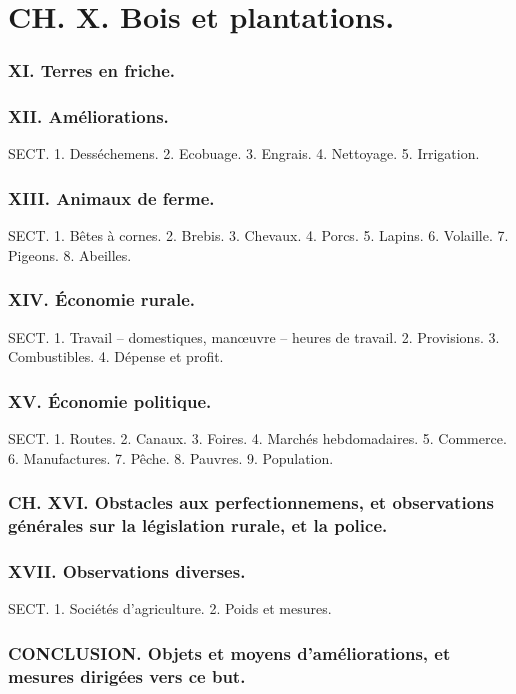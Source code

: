\section{CH. X. Bois et plantations.}
\subsubsection{XI. Terres en friche.}
\subsubsection{XII. Améliorations.}
SECT. 1. Desséchemens.
2. Ecobuage.
3. Engrais.
4. Nettoyage.
5. Irrigation.
\subsubsection{XIII. Animaux de ferme.}
SECT. 1. Bêtes à cornes.
2. Brebis.
3. Chevaux.
4. Porcs.
5. Lapins.
6. Volaille.
7. Pigeons.
8. Abeilles.
\subsubsection{XIV. Économie rurale.}
SECT. 1. Travail -- domestiques, manœuvre
-- heures de travail.
2. Provisions.
3. Combustibles.
4. Dépense et profit.
\subsubsection{XV. Économie politique.}
SECT. 1. Routes.
2. Canaux.
3. Foires.
4. Marchés hebdomadaires.
\setcounter{page}{342}
5. Commerce.
6. Manufactures.
7. Pêche.
8. Pauvres.
9. Population.
\subsubsection{CH. XVI. Obstacles aux perfectionnemens, et observations générales sur la législation rurale, et la police.}
\subsubsection{XVII. Observations diverses.}
SECT. 1. Sociétés d'agriculture.
2. Poids et mesures.
\subsubsection{CONCLUSION. Objets et moyens d'améliorations, et mesures dirigées vers ce but.}

